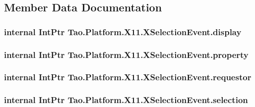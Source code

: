 \subsection{Member Data Documentation}
\hypertarget{struct_tao_1_1_platform_1_1_x11_1_1_x_selection_event_a4e01807ca758d1a642aaa5360143c6e8}{
\subsubsection[{display}]{\setlength{\rightskip}{0pt plus 5cm}internal IntPtr {\bf Tao.Platform.X11.XSelectionEvent.display}}}
\label{struct_tao_1_1_platform_1_1_x11_1_1_x_selection_event_a4e01807ca758d1a642aaa5360143c6e8}
\hypertarget{struct_tao_1_1_platform_1_1_x11_1_1_x_selection_event_a01e8a896e5a918bb1882bf3b5344d602}{
\subsubsection[{property}]{\setlength{\rightskip}{0pt plus 5cm}internal IntPtr {\bf Tao.Platform.X11.XSelectionEvent.property}}}
\label{struct_tao_1_1_platform_1_1_x11_1_1_x_selection_event_a01e8a896e5a918bb1882bf3b5344d602}
\hypertarget{struct_tao_1_1_platform_1_1_x11_1_1_x_selection_event_addb40acc81cf190640e17f538383ceed}{
\subsubsection[{requestor}]{\setlength{\rightskip}{0pt plus 5cm}internal IntPtr {\bf Tao.Platform.X11.XSelectionEvent.requestor}}}
\label{struct_tao_1_1_platform_1_1_x11_1_1_x_selection_event_addb40acc81cf190640e17f538383ceed}
\hypertarget{struct_tao_1_1_platform_1_1_x11_1_1_x_selection_event_afa55c998e8365437cad6e65d816bc117}{
\subsubsection[{selection}]{\setlength{\rightskip}{0pt plus 5cm}internal IntPtr {\bf Tao.Platform.X11.XSelectionEvent.selection}}}
